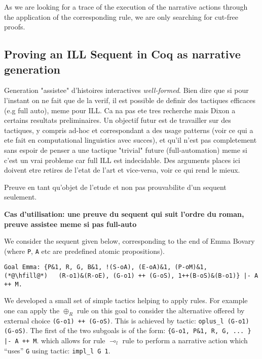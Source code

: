 \documentclass[runningheads,a4paper]{llncs}
\begin{document}
As we are looking for a trace of the execution of the narrative actions through the application of the corresponding rule, we are only searching for cut-free proofs.
\subsection{Proving an ILL Sequent in Coq as narrative generation}
\label{sec:proving-an-ill}

Generation "assistee" d'histoires interactives \emph{well-formed}. Bien dire que si pour l'instant on ne fait que de la verif, il est possible de definir des tactiques efficaces (e.g full auto), meme pour ILL. Ca na pas ete tres recherche mais Dixon a certains resultats preliminaires. Un objectif futur est de travailler sur des tactiques, y compris ad-hoc et correspondant a des usage patterns (voir ce qui a ete fait en computational linguistics avec succes), et qu'il n'est pas completement sans espoir de penser a une tactique "trivial" future (full-automation) meme si c'est un vrai probleme car full ILL est indecidable. Des arguments places ici doivent etre retires de l'etat de l'art et vice-versa, voir ce qui rend le mieux.

Preuve en tant qu'objet de l'etude et non pas prouvabilite d'un sequent seulement.

\textbf{Cas d'utilisation: une preuve du sequent qui suit l'ordre du roman, preuve assistee meme si pas full-auto}

We consider the sequent given below, corresponding to the end of Emma
Bovary (where \texttt{P}, \texttt{A} etc are predefined atomic
propositions).
\begin{lstlisting}[language=Coq]
Goal Emma: {P&1, R, G, B&1, !(S-oA), (E-oA)&1, (P-oM)&1,
(*@\hfill@*)   (R-o1)&(R-oE), (G-o1) ++ (G-oS), 1++(B-oS)&(B-o1)} |- A ++ M.
\end{lstlisting}
We developed a small set of simple tactics helping to apply rules. For
example one can apply the $\oplus_R$ rule on this goal to consider the
alternative offered by external choice \lstinline|(G-o1) ++ (G-oS)|.
This is achieved by tactic: \lstinline|oplus_l (G-o1) (G-oS)|. The
first of the two subgoals is of the form:
\lstinline!{G-o1, P&1, R, G, ... } |- A ++ M!. which allows for rule
$\multimap_l$ rule to perform a narrative action which ``uses''
\lstinline|G| using tactic: \lstinline|impl_l G 1|. 
\end{document}
